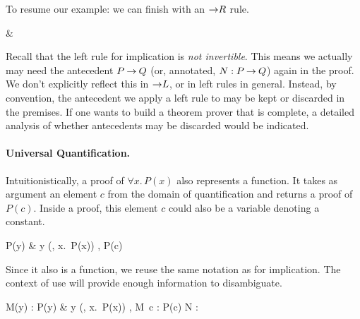 \documentclass[11pt]{article}
\begin{document}
To resume our example: we can finish with an ${\mathbin{\rightarrow}}R$ rule.
\begin{rules}
  {
    {
      {
        {}
        & 
        {}}}}
\end{rules}

Recall that the left rule for implication is \emph{not invertible}.  This means
we actually may need the antecedent $P \mathbin{\rightarrow} Q$ (or, annotated,
$N : P \mathbin{\rightarrow} Q$) again in the proof.  We don't explicitly reflect this in
${\mathbin{\rightarrow}}L$, or in left rules in general.  Instead, by convention, the
antecedent we apply a left rule to may be kept or discarded in the premises.  If
one wants to build a theorem prover that is complete, a detailed analysis of
whether antecedents may be discarded would be indicated.

\paragraph{Universal Quantification.}
Intuitionistically, a proof of $\forall x.\, P(x)$ also represents a function.
It takes as argument an element $c$ from the domain of quantification and
returns a proof of $P(c)$.  Inside a proof, this element $c$ could also be a
variable denoting a constant.
\begin{rules}
  {\Gamma \vdash P(y) & y \not\in (\Gamma, \forall x.\, P(x))}
  \hspace{3em}
  {\Gamma, P(c) \vdash \delta}
\end{rules}
Since it also is a function, we reuse the same notation as for implication.  The
context of use will provide enough information to disambiguate.
\begin{rules}
  {\Gamma \vdash M(y) : P(y) & y \not\in (\Gamma, \forall x.\, P(x))}
  \hspace{3em}
  {\Gamma, M\, c : P(c) \vdash N : \delta}
\end{rules}
\end{document}
